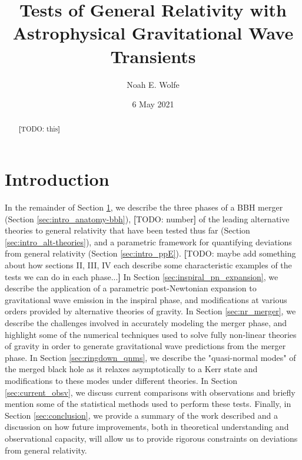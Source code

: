 \documentclass[aps,prd,twocolumn,floatfix,preprintnumbers,altaffilletter,superscriptaddress]{revtex4-1}
\newcommand{\TODO}[1]{\textbf{[}{\color{red}TODO: }{\color{blue}#1}\textbf{]}}
\begin{document}
\title{Tests of General Relativity with Astrophysical Gravitational Wave Transients}
\author{Noah E. Wolfe}
\date{6 May 2021}

\begin{abstract}
    \TODO{this}
\end{abstract}

\maketitle

\section{Introduction} \label{sec:intro}




In the remainder of Section \ref{sec:intro}, we describe the three phases of a BBH merger (Section \ref{sec:intro_anatomy-bbh}), \TODO{number} of the leading alternative theories to general relativity that have been tested thus far (Section \ref{sec:intro_alt-theories}), and a parametric framework for quantifying deviations from general relativity (Section \ref{sec:intro_ppE}). \TODO{maybe add something about how sections II, III, IV each describe some characteristic examples of the tests we can do in each phase...} In Section \ref{sec:inspiral_pn_expansion}, we describe the application of a parametric post-Newtonian expansion to gravitational wave emission in the inspiral phase, and modifications at various orders provided by alternative theories of gravity. In Section \ref{sec:nr_merger}, we describe the challenges involved in accurately modeling the merger phase, and highlight some of the numerical techniques used to solve fully non-linear theories of gravity in order to generate gravitational wave predictions from the merger phase. In Section \ref{sec:ringdown_qnms}, we describe the "quasi-normal modes" of the merged black hole as it relaxes asymptotically to a Kerr state and modifications to these modes under different theories. In Section \ref{sec:current_obsv}, we discuss current comparisons with observations and briefly mention some of the statistical methods used to perform these tests. Finally, in Section \ref{sec:conclusion}, we provide a summary of the work described and a discussion on how future improvements, both in theoretical understanding and observational capacity, will allow us to provide rigorous constraints on deviations from general relativity.
\end{document}
